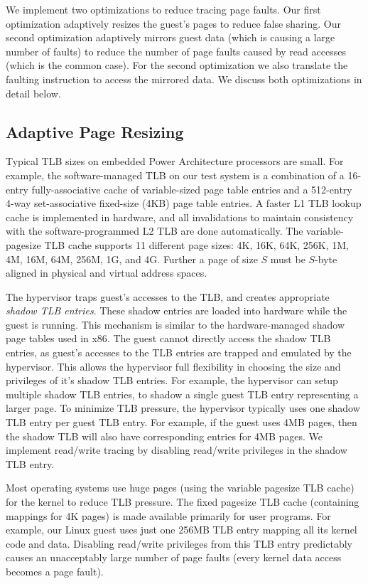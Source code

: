 \documentclass[10pt,twocolumn]{article}
\begin{document}
We implement two optimizations to reduce tracing page faults. Our first optimization
adaptively resizes the guest's pages to reduce false sharing.
Our second optimization adaptively
mirrors guest data (which is causing a large number of faults) to reduce the number
of page faults caused by read accesses (which is the common case). For the second
optimization we also translate the faulting instruction to access the mirrored data.
We discuss both optimizations in detail below.

\subsection{Adaptive Page Resizing}
Typical TLB sizes on embedded Power Architecture processors are small.
For example, the software-managed TLB on our test system is a combination of a 16-entry
fully-associative cache of variable-sized page table entries
and a 512-entry 4-way set-associative fixed-size (4KB) page table entries.
A faster L1 TLB lookup cache is implemented in hardware, and all invalidations
to maintain consistency with the software-programmed L2 TLB are done automatically.
The variable-pagesize TLB cache supports 11 different page sizes: 4K, 16K, 64K,
256K, 1M, 4M, 16M, 64M, 256M, 1G, and 4G. Further a page of size $S$ must be $S$-byte
aligned in physical and virtual address spaces.

The hypervisor traps guest's accesses to the TLB, and creates appropriate
{\em shadow TLB entries}. These shadow entries are loaded into hardware
while the guest is
running. This mechanism is similar to the hardware-managed shadow page
tables used in x86\cite{adams:asplos06}. The guest cannot directly access the shadow
TLB entries, as guest's accesses to the TLB entries are trapped and emulated by
the hypervisor. This allows the hypervisor full flexibility in choosing the
size and privileges of it's shadow TLB entries. For example, the hypervisor
can setup multiple shadow TLB entries, to shadow a single guest TLB entry representing
a larger page.
To minimize TLB pressure, the hypervisor typically uses
one shadow TLB entry per guest TLB entry. For example, if the guest uses 4MB pages,
then the shadow TLB will also have corresponding entries for 4MB pages. We
implement read/write tracing by disabling read/write privileges in the shadow TLB entry.

Most operating systems use huge pages (using the variable pagesize TLB cache)
for the kernel to
reduce TLB pressure. The fixed pagesize TLB cache (containing mappings for 4K pages) is
made available primarily for user programs. For example, our Linux guest
uses just one 256MB TLB entry mapping all its kernel code and data.
Disabling read/write privileges from this TLB entry predictably causes an unacceptably
large number of page faults (every kernel data access becomes a page fault).
\end{document}
